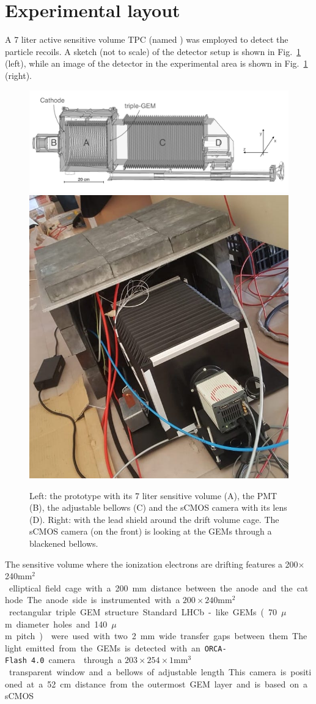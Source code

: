 \documentclass[12pt]{iopart}
\begin{document}
\section{Experimental layout}
\label{sec:layout}
A 7 liter active sensitive volume TPC (named \lemon) was employed to
detect the particle recoils. A sketch (not to scale) of the detector
setup is shown in Fig.~\ref{fig:lemon} (left), while an image of the
detector in the experimental area is shown in Fig.~\ref{fig:lemon}
(right).
% 
\begin{figure}[ht]
	\centering
	\includegraphics[width=0.70\linewidth]{figures/lemon.png}
        \includegraphics[width=0.20\linewidth]{LEMON-Shielded.jpg}
  	\caption{Left: the \lemon prototype with  its 7 liter sensitive
          volume (A), the PMT (B), the adjustable bellows (C) and the
          sCMOS camera with its lens (D). Right: \lemon
          with the lead shield around the drift volume cage. The sCMOS
          camera (on the front) is looking at the GEMs through a
          blackened bellows.
  	\label{fig:lemon}}
\end{figure}
%
The sensitive volume where the ionization electrons are drifting
features a 200$\times$240\unit{mm$^2$} elliptical field cage with a
200 mm distance between the anode and the cathode. The anode side is
instrumented with a $200{\times}240$\unit{mm$^2$} rectangular triple
GEM structure.  Standard LHCb-like GEMs (70\unit{$\mu$m} diameter
holes and 140\unit{$\mu$m} pitch)~\cite{bib:thesis} were used with two
2\unit{mm} wide transfer gaps between them. The light emitted from the
GEMs is detected with an \texttt{ORCA-Flash~4.0} camera \cite{ORCAcamera}
through a $203{\times}254{\times}1$\unit{mm$^3$} transparent window
and a bellows of adjustable length.  This camera is positioned at a 52
cm distance from the outermost GEM layer and is based on a sCMOS
\end{document}
